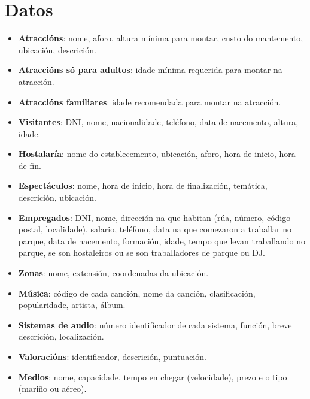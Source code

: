 \documentclass[12pt,a4paper]{book}
\theoremstyle{definition}
\theoremstyle{break}
\begin{document}
	\section{Datos}
	\begin{itemize}
		\item \textbf{Atraccións}: nome, aforo, altura mínima para montar, custo do mantemento, ubicación, descrición.
		
		\item \textbf{Atraccións só para adultos}: idade mínima requerida para montar na atracción.
		
		\item \textbf{Atraccións familiares}: idade recomendada para montar na atracción.
		
		\item \textbf{Visitantes}: DNI, nome, nacionalidade, teléfono, data de nacemento, altura, idade.
		
		\item \textbf{Hostalaría}: nome do establecemento, ubicación, aforo, hora de inicio, hora de fin.
		
		\item \textbf{Espectáculos}: nome, hora de inicio, hora de finalización, temática, descrición, ubicación.
		
		\item \textbf{Empregados}: DNI, nome, dirección na que habitan (rúa, número, código postal, localidade), salario, teléfono, data na que comezaron a traballar no parque, data de nacemento, formación, idade, tempo que levan traballando no parque, se son hostaleiros ou se son traballadores de parque ou DJ.
		
		\item \textbf{Zonas}: nome, extensión, coordenadas da ubicación.
		
		\item \textbf{Música}: código de cada canción, nome da canción, clasificación, popularidade, artista, álbum.
		
		\item \textbf{Sistemas de audio}: número identificador de cada sistema, función, breve
		descrición, localización.
		
		\item \textbf{Valoracións}: identificador, descrición, puntuación.
		
		\item \textbf{Medios}: nome, capacidade, tempo en chegar (velocidade), prezo e o tipo (mariño ou aéreo).
	\end{itemize}
	
\end{document}
